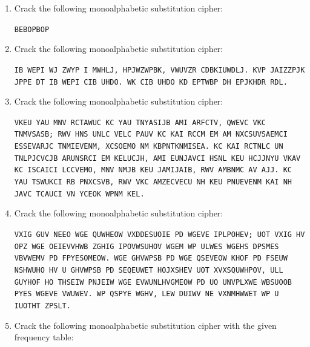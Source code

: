 \documentclass{book}
\theoremstyle{plain}
\theoremstyle{definition}
\newif\ifprintsolutions
\newcommand{\solution}[1]{\ifprintsolutions \begin{sloppypar}{\it #1}\end{sloppypar} \fi} %
\newcommand{\display}[1]{\begin{sloppypar}\setlength{\parindent}{0mm}#1\end{sloppypar}} %
\newcommand{\ciphertextspace}[1]{\begin{sloppypar}\doublespacing\Large\texttt{#1}\end{sloppypar}} %
\begin{document}
\begin{enumerate}
\item Crack the following monoalphabetic substitution cipher:
\display{\ciphertextspace{BEBOPBOP}} \solution{No keyword: nonsense}
\item Crack the following monoalphabetic substitution cipher:
\display{\ciphertextspace{IB WEPI WJ ZWYP I MWHLJ, HPJWZWPBK, VWUVZR CDBKIUWDLJ. KVP JAIZZPJK JPPE DT IB WEPI CIB UHDO. WK CIB UHDO KD EPTWBP DH EPJKHDR RDL.}} \solution{Keyword INCEPT: An idea is like a virus, resilient, highly contagious. The smallest seed of an idea can grow. It can grow to define or destroy you.}
\item Crack the following monoalphabetic substitution cipher:
\display{\ciphertextspace{VKEU YAU MNV RCTAWUC KC YAU TNYASIJB AMI ARFCTV, QWEVC VKC TNMVSASB; RWV HNS UNLC VELC PAUV KC KAI RCCM EM AM NXCSUVSAEMCI ESSEVARJC TNMIEVENM, XCSOEMO NM KBPNTKNMISEA. KC KAI RCTNLC UN TNLPJCVCJB ARUNSRCI EM KELUCJH, AMI EUNJAVCI HSNL KEU HCJJNYU VKAV KC ISCAICI LCCVEMO, MNV NMJB KEU JAMIJAIB, RWV AMBNMC AV AJJ. KC YAU TSWUKCI RB PNXCSVB, RWV VKC AMZECVECU NH KEU PNUEVENM KAI NH JAVC TCAUCI VN YCEOK WPNM KEL.}} \solution{Keyword ARTICHOKE: This was not because he was cowardly and abject, quite the contrary; but for some time past he had been in an overstrained irritable condition, verging on hypochondria. He had become so completely absorbed in himself, and isolated from his fellows that he dreaded meeting, not only his landlady, but anyone at all. He was crushed by poverty, but the anxieties of his position had of late ceased to weigh upon him.}
\item Crack the following monoalphabetic substitution cipher:
\display{\ciphertextspace{VXIG GUV NEEO WGE QUWHEOW VXDDESUOIE PD WGEVE IPLPOHEV; UOT VXIG HV OPZ WGE OEIEVVHWB ZGHIG IPOVWSUHOV WGEM WP ULWES WGEHS DPSMES VBVWEMV PD FPYESOMEOW. WGE GHVWPSB PD WGE QSEVEOW KHOF PD FSEUW NSHWUHO HV U GHVWPSB PD SEQEUWET HOJXSHEV UOT XVXSQUWHPOV, ULL GUYHOF HO THSEIW PNJEIW WGE EVWUNLHVGMEOW PD UO UNVPLXWE WBSUOOB PYES WGEVE VWUWEV. WP QSPYE WGHV, LEW DUIWV NE VXNMHWWET WP U IUOTHT ZPSLT.}} \solution{Keyword UNITED: Such has been the patient sufferance of these Colonies; and such is now the necessity which constrains them to alter their former Systems of Government. The history of the present King of Great Britain is a history of repeated injuries and usurpations, all having in direct object the establishment of an absolute Tyranny over these States. To prove this, let Facts be submitted to a candid world.}
\item Crack the following monoalphabetic substitution cipher with the given frequency table:

\end{enumerate}
\end{document}
